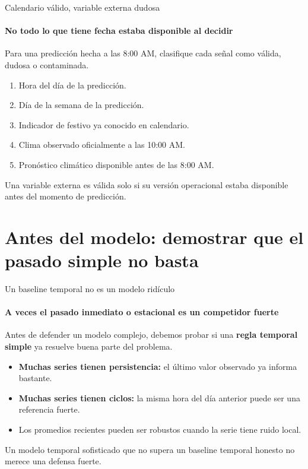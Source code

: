 \documentclass[aspectratio=169,11pt]{beamer}  %
\newcommand{\Lg}{\fontsize{16}{20}\selectfont}
\newcommand{\bigstate}[1]{\begin{center}\Lg #1\end{center}}
\begin{document}
\begin{frame}{Calendario válido, variable externa dudosa}
\framesubtitle{No todo lo que tiene fecha estaba disponible al decidir}
\begin{taskbox}
Para una predicción hecha a las 8:00 AM, clasifique cada señal como válida, dudosa o contaminada.
\end{taskbox}
\begin{enumerate}
\item Hora del día de la predicción.
\item Día de la semana de la predicción.
\item Indicador de festivo ya conocido en calendario.
\item Clima observado oficialmente a las 10:00 AM.
\item Pronóstico climático disponible antes de las 8:00 AM.
\end{enumerate}
Una variable externa es válida solo si su versión operacional estaba disponible antes del momento de predicción.
\end{frame}

\section{Antes del modelo: demostrar que el pasado simple no basta}

\begin{frame}{Un baseline temporal no es un modelo ridículo}
\framesubtitle{A veces el pasado inmediato o estacional es un competidor fuerte}
\bigstate{Antes de defender un modelo complejo, debemos probar si una \textbf{regla temporal simple} ya resuelve buena parte del problema.}
\begin{itemize}
\item \textbf{Muchas series tienen persistencia:} el último valor observado ya informa bastante.
\item \textbf{Muchas series tienen ciclos:} la misma hora del día anterior puede ser una referencia fuerte.
\item Los promedios recientes pueden ser robustos cuando la serie tiene ruido local.
\end{itemize}
\begin{rulebox}
Un modelo temporal sofisticado que no supera un baseline temporal honesto no merece una defensa fuerte.
\end{rulebox}
\end{frame}
\end{document}
